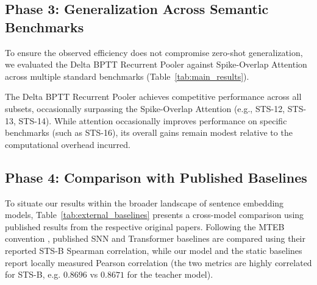 \documentclass[runningheads]{llncs}
\begin{document}
\subsection{Phase 3: Generalization Across Semantic Benchmarks}
To ensure the observed efficiency does not compromise zero-shot generalization, we evaluated the Delta BPTT Recurrent Pooler against Spike-Overlap Attention across multiple standard benchmarks (Table~\ref{tab:main_results}).

The Delta BPTT Recurrent Pooler achieves competitive performance across all subsets, occasionally surpassing the Spike-Overlap Attention (e.g., STS-12, STS-13, STS-14). While attention occasionally improves performance on specific benchmarks (such as STS-16), its overall gains remain modest relative to the computational overhead incurred.

\subsection{Phase 4: Comparison with Published Baselines}
To situate our results within the broader landscape of sentence embedding models, Table~\ref{tab:external_baselines} presents a cross-model comparison using published results from the respective original papers. Following the MTEB convention \cite{muennighoff2022mteb}, published SNN and Transformer baselines are compared using their reported STS-B Spearman correlation, while our model and the static baselines report locally measured Pearson correlation (the two metrics are highly correlated for STS-B, e.g. $0.8696$ vs $0.8671$ for the teacher model).
\end{document}
